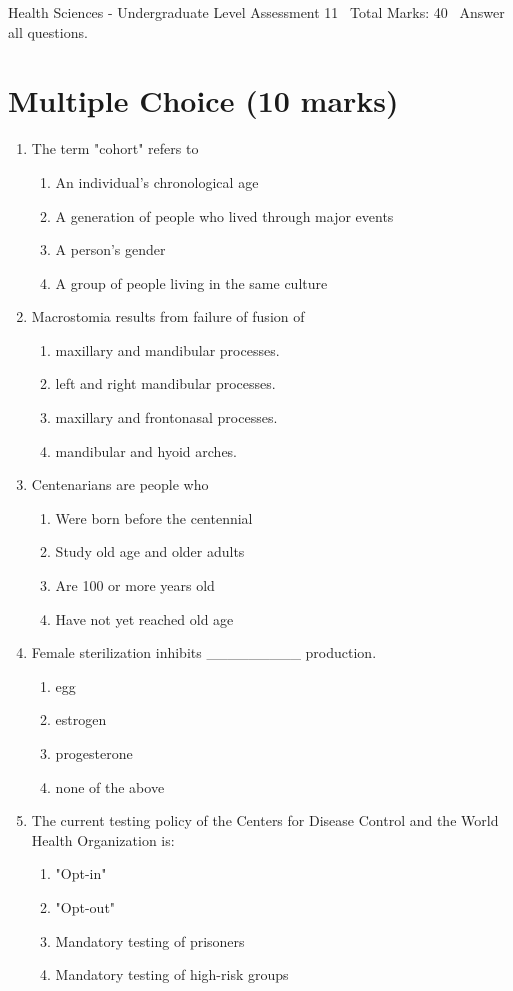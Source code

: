 \documentclass[12pt]{article}
\begin{document}
\begin{center}
Health Sciences - Undergraduate Level Assessment 11 \
Total Marks: 40 \
Answer all questions.
\end{center}

\section*{Multiple Choice (10 marks)}
\begin{enumerate}[label=\arabic*.]
\item The term "cohort" refers to
\begin{enumerate}[label=(\alph*)]
    \item An individual's chronological age
    \item A generation of people who lived through major events
    \item A person's gender
    \item A group of people living in the same culture
\end{enumerate}
\item Macrostomia results from failure of fusion of
\begin{enumerate}[label=(\alph*)]
    \item maxillary and mandibular processes.
    \item left and right mandibular processes.
    \item maxillary and frontonasal processes.
    \item mandibular and hyoid arches.
\end{enumerate}
\item Centenarians are people who
\begin{enumerate}[label=(\alph*)]
    \item Were born before the centennial
    \item Study old age and older adults
    \item Are 100 or more years old
    \item Have not yet reached old age
\end{enumerate}
\item Female sterilization inhibits \_\_\_\_\_\_\_\_\_ production.
\begin{enumerate}[label=(\alph*)]
    \item egg
    \item estrogen
    \item progesterone
    \item none of the above
\end{enumerate}
\item The current testing policy of the Centers for Disease Control and the World Health Organization is:
\begin{enumerate}[label=(\alph*)]
    \item "Opt-in"
    \item "Opt-out"
    \item Mandatory testing of prisoners
    \item Mandatory testing of high-risk groups
\end{enumerate}
\end{enumerate}
\end{document}

